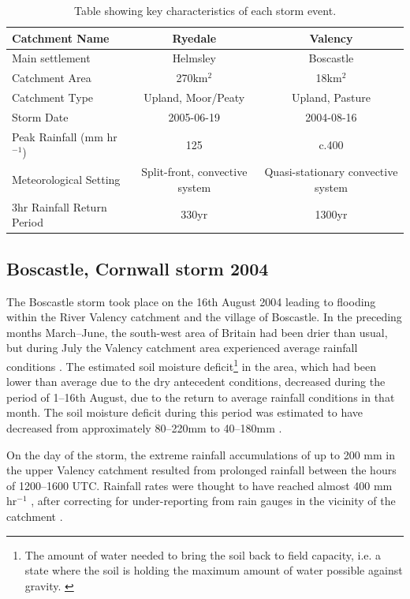 \linespread{1.5}
\begin{table}
\resizebox{\textwidth}{!}
{%
\begin{tabular}{l c c} \hline

Catchment Name 			& \textbf{Ryedale} &  \textbf{Valency} \\ \hline
Main settlement        & Helmsley             & Boscastle \\
Catchment Area   			& 270km$^2$ 				& 18km$^2$ \\ 
Catchment Type         & Upland, Moor/Peaty & Upland, Pasture \\ 
Storm Date	 		            & 2005-06-19 	& 2004-08-16 \\ 
Peak Rainfall	 (mm hr \(^{-1}\))  & 125  & c.400 \\
Meteorological Setting	 	& Split-front, convective system & Quasi-stationary convective system \\ 
3hr Rainfall Return Period 	 & 330yr \citep{wass2008investigation}	& 1300yr \citep{burt2005cloudburst} \\ \hline
\end{tabular}
}
\caption{Table showing key characteristics of each storm event.}
\label{table_met_setting}
\end{table}

\subsection{Boscastle, Cornwall storm 2004}
The Boscastle storm took place on the 16th August 2004 leading to flooding within the River Valency catchment and the village of Boscastle. In the preceding months March--June, the south-west area of Britain had been drier than usual, but during July the Valency catchment area experienced average rainfall conditions \citep{golding2005boscastle}. The estimated soil moisture deficit\footnote{The amount of water needed to bring the soil back to field capacity, i.e. a state where the soil is holding the maximum amount of water possible against gravity. \citep{beven2011rainfall}} in the area, which had been lower than average due to the dry antecedent conditions, decreased during the period of 1--16th August, due to the return to average rainfall conditions in that month. The soil moisture deficit during this period was estimated to have decreased from approximately 80--220mm to 40--180mm \citep{golding2005boscastle}.

On the day of the storm, the extreme rainfall accumulations of up to 200 mm in the upper Valency catchment resulted from prolonged rainfall between the hours of 1200--1600 UTC. Rainfall rates were thought to have reached almost 400 mm hr\(^{-1}\) \citep{golding2005boscastle}, after correcting for under-reporting from rain gauges in the vicinity of the catchment \citep{burt2005cloudburst}.

